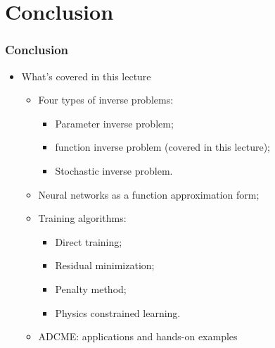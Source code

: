 \documentclass{beamer}
\begin{document}
\section{Conclusion}


\begin{frame}
	\frametitle{Conclusion}
	\begin{itemize}
		\item What's covered in this lecture
		\begin{itemize}
		\item Four types of inverse problems: 
		\begin{itemize}
			\item Parameter inverse problem;
			\item function inverse problem (covered in this lecture);
			\item Stochastic inverse problem.
		\end{itemize}
		\item Neural networks as a function approximation form;
		\item Training algorithms:
		\begin{itemize}
		\item Direct training;
		\item Residual minimization;
		\item Penalty method;
		\item Physics constrained learning.
		\end{itemize}
		\item ADCME: applications and hands-on examples
		\end{itemize}
	\end{itemize}
\end{frame}
\end{document}
